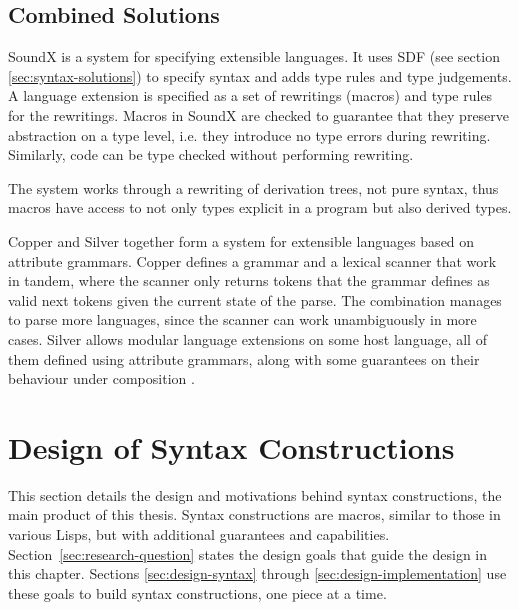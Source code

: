 \documentclass{kththesis}
\begin{document}
\section{Combined Solutions} \label{sec:full-solutions}

SoundX \cite{Lorenzen2016Sound-type-depe} is a system for specifying extensible languages. It uses SDF (see section \ref{sec:syntax-solutions}) to specify syntax and adds type rules and type judgements. A language extension is specified as a set of rewritings (macros) and type rules for the rewritings. Macros in SoundX are checked to guarantee that they preserve abstraction on a type level, i.e. they introduce no type errors during rewriting. Similarly, code can be type checked without performing rewriting.

The system works through a rewriting of derivation trees, not pure syntax, thus macros have access to not only types explicit in a program but also derived types.

Copper \cite{Van-Wyk2007Context-aware-s} and Silver \cite{Van-Wyk2010Silver:-An-exte} together form a system for extensible languages based on attribute grammars. Copper defines a grammar and a lexical scanner that work in tandem, where the scanner only returns tokens that the grammar defines as valid next tokens given the current state of the parse. The combination manages to parse more languages, since the scanner can work unambiguously in more cases. Silver allows modular language extensions on some host language, all of them defined using attribute grammars, along with some guarantees on their behaviour under composition \cite{Kaminski2017Reliably-compos}.

\chapter{Design of Syntax Constructions} \label{sec:syntax-constructions}

This section details the design and motivations behind syntax constructions, the main product of this thesis. Syntax constructions are macros, similar to those in various Lisps, but with additional guarantees and capabilities. Section~\ref{sec:research-question} states the design goals that guide the design in this chapter. Sections \ref{sec:design-syntax} through \ref{sec:design-implementation} use these goals to build syntax constructions, one piece at a time.
\end{document}
